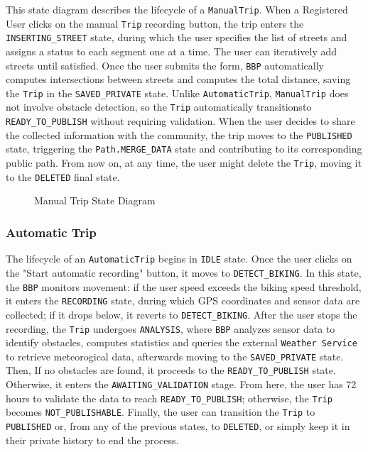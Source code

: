 This state diagram describes the lifecycle of a \texttt{ManualTrip}. When a Registered User clicks on the manual \texttt{Trip} recording button, the trip enters the \texttt{INSERTING\_STREET} state, during which the user specifies the list of streets and assigns a status to each segment one at a time. The user can iteratively add streets until satisfied. Once the user submits the form, \texttt{BBP} automatically computes intersections between streets and computes the total distance, saving the \texttt{Trip} in the \texttt{SAVED\_PRIVATE} state. Unlike \texttt{AutomaticTrip}, \texttt{ManualTrip} does not involve obstacle detection, so the \texttt{Trip} automatically transitionsto \texttt{READY\_TO\_PUBLISH} without requiring validation. When the user decides to share the collected information with the community, the trip moves to the \texttt{PUBLISHED} state, triggering the \texttt{Path.MERGE\_DATA} state and contributing to its corresponding public path. From now on, at any time, the user might delete the \texttt{Trip}, moving it to the \texttt{DELETED} final state.

\begin{figure}[H]
    \centering
    
    \caption{Manual Trip State Diagram}
    \label{fig:manual_trip_state}
\end{figure}

\subsubsection{Automatic Trip}

The lifecycle of an \texttt{AutomaticTrip} begins in \texttt{IDLE} state. Once the user clicks on the "Start automatic recording" button, it moves to \texttt{DETECT\_BIKING}. In this state, the \texttt{BBP} monitors movement: if the user speed exceeds the biking speed threshold, it enters the \texttt{RECORDING} state, during which GPS coordinates and sensor data are collected; if it drops below, it reverts to \texttt{DETECT\_BIKING}. After the user stops the recording, the \texttt{Trip} undergoes \texttt{ANALYSIS}, where \texttt{BBP} analyzes sensor data to identify obstacles, computes statistics and queries the external \texttt{Weather Service} to retrieve meteorogical data, afterwards moving to the \texttt{SAVED\_PRIVATE} state. \\ 
Then, If no obstacles are found, it proceeds to the \texttt{READY\_TO\_PUBLISH} state. Otherwise, it enters the \texttt{AWAITING\_VALIDATION} stage. From here, the user has 72 hours to validate the data to reach \texttt{READY\_TO\_PUBLISH}; otherwise, the \texttt{Trip} becomes \texttt{NOT\_PUBLISHABLE}. Finally, the user can transition the \texttt{Trip} to \texttt{PUBLISHED} or, from any of the previous states, to \texttt{DELETED}, or simply keep it in their private history to end the process.

